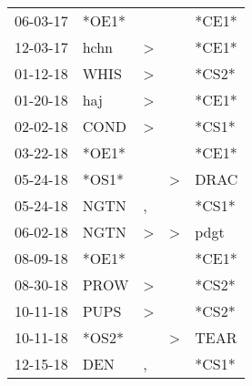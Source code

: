 \begin{supertabular}{p{0.07\textwidth}p{0.06\textwidth}p{0.02\textwidth}p{0.02\textwidth}p{0.06\textwidth}}
          06-03-17\textsuperscript{} &                            *OE1* &                  &                  &                            *CE1* \\
          12-03-17\textsuperscript{} &           hchn\textsuperscript{} &     \textgreater &                  &                            *CE1* \\
          01-12-18\textsuperscript{} &           WHIS\textsuperscript{} &     \textgreater &                  &                            *CS2* \\
          01-20-18\textsuperscript{} &            haj\textsuperscript{} &     \textgreater &                  &                            *CE1* \\
          02-02-18\textsuperscript{} &           COND\textsuperscript{} &     \textgreater &                  &                            *CS1* \\
          03-22-18\textsuperscript{} &                            *OE1* &                  &                  &                            *CE1* \\
          05-24-18\textsuperscript{} &                            *OS1* &                  &     \textgreater &           DRAC\textsuperscript{} \\
          05-24-18\textsuperscript{} &           NGTN\textsuperscript{} &                , &                  &                            *CS1* \\
          06-02-18\textsuperscript{} &           NGTN\textsuperscript{} &     \textgreater &     \textgreater &           pdgt\textsuperscript{} \\
          08-09-18\textsuperscript{} &                            *OE1* &                  &                  &                            *CE1* \\
          08-30-18\textsuperscript{} &           PROW\textsuperscript{} &     \textgreater &                  &                            *CS2* \\
          10-11-18\textsuperscript{} &           PUPS\textsuperscript{} &     \textgreater &                  &                            *CS2* \\
          10-11-18\textsuperscript{} &                            *OS2* &                  &     \textgreater &           TEAR\textsuperscript{} \\
          12-15-18\textsuperscript{} &            DEN\textsuperscript{} &                , &                  &                            *CS1* \\

\end{supertabular}
